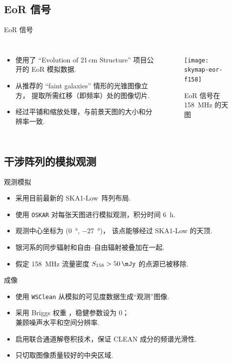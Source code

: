 \documentclass{beamer}
\begin{document}
\subsection{EoR 信号}

\begin{frame}{EoR 信号}
  \begin{columns}
    \begin{itemize}
      \item 使用了 \enquote{Evolution of 21\,cm Structure}
        项目公开的 EoR 模拟数据.
      \item 从推荐的 \enquote{faint galaxies} 情形的光锥图像立方，
        提取所需红移（即频率）处的图像切片.
      \item 经过平铺和缩放处理，与前景天图的大小和分辨率一致.
    \end{itemize}

    \begin{figure}
      \centering
      \texttt{[image: skymap-eor-f158]}
      \caption{EoR 信号在 \SI{158}{\MHz} 的天图}
    \end{figure}
  \end{columns}
\end{frame}

\subsection{干涉阵列的模拟观测}

\begin{frame}{观测模拟}
  \begin{itemize}
    \item 采用目前最新的 SKA1-Low~阵列布局.
    \item 使用 \texttt{OSKAR} 对每张天图进行模拟观测，积分时间 \SI{6}{\hour}.
    \item 观测中心坐标为 (\SI{0}{\degree}, \SI{-27}{\degree})，
      该点能够经过 SKA1-Low 的天顶.
    \item 银河系的同步辐射和自由--自由辐射被叠加在一起.
    \item 假定 \SI{158}{\MHz} 流量密度 $S_{158} > \SI{50}{\mJy}$
      的点源已被移除.
  \end{itemize}
\end{frame}

\begin{frame}{成像}
  \begin{itemize}
    \item 使用 \texttt{WSClean} 从模拟的可见度数据生成\enquote{观测}图像.
    \item 采用 Briggs 权重 \cite{briggs1995}，稳健参数设为 0；\\
      兼顾噪声水平和空间分辨率.
    \item 启用联合通道解卷积技术，保证 CLEAN 成分的频谱光滑性.
    \item 只切取图像质量较好的中央区域.
  \end{itemize}
\end{frame}
\end{document}
